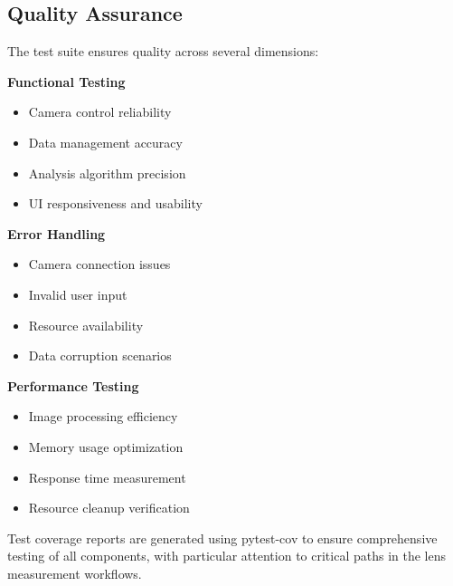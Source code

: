 \subsection{Quality Assurance}
The test suite ensures quality across several dimensions:

\textbf{Functional Testing}
\begin{itemize}
    \item Camera control reliability
    \item Data management accuracy
    \item Analysis algorithm precision
    \item UI responsiveness and usability
\end{itemize}

\textbf{Error Handling}
\begin{itemize}
    \item Camera connection issues
    \item Invalid user input
    \item Resource availability
    \item Data corruption scenarios
\end{itemize}

\textbf{Performance Testing}
\begin{itemize}
    \item Image processing efficiency
    \item Memory usage optimization
    \item Response time measurement
    \item Resource cleanup verification
\end{itemize}

Test coverage reports are generated using pytest-cov to ensure comprehensive testing of all components, with particular attention to critical paths in the lens measurement workflows.


